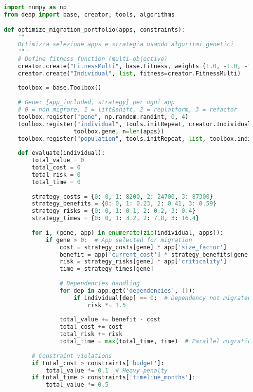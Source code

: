 \begin{lstlisting}[language=Python, caption=Algoritmo Genetico per Portfolio Optimization]
import numpy as np
from deap import base, creator, tools, algorithms

def optimize_migration_portfolio(apps, constraints):
    """
    Ottimizza selezione apps e strategia usando algoritmi genetici
    """
    # Define fitness function (multi-objective)
    creator.create("FitnessMulti", base.Fitness, weights=(1.0, -1.0, -1.0))
    creator.create("Individual", list, fitness=creator.FitnessMulti)
    
    toolbox = base.Toolbox()
    
    # Gene: [app_included, strategy] per ogni app
    # 0 = non migrare, 1 = lift&shift, 2 = replatform, 3 = refactor
    toolbox.register("gene", np.random.randint, 0, 4)
    toolbox.register("individual", tools.initRepeat, creator.Individual,
                    toolbox.gene, n=len(apps))
    toolbox.register("population", tools.initRepeat, list, toolbox.individual)
    
    def evaluate(individual):
        total_value = 0
        total_cost = 0
        total_risk = 0
        total_time = 0
        
        strategy_costs = {0: 0, 1: 8200, 2: 24700, 3: 87300}
        strategy_benefits = {0: 0, 1: 0.23, 2: 0.41, 3: 0.59}
        strategy_risks = {0: 0, 1: 0.1, 2: 0.2, 3: 0.4}
        strategy_times = {0: 0, 1: 3.2, 2: 7.8, 3: 16.4}
        
        for i, (gene, app) in enumerate(zip(individual, apps)):
            if gene > 0:  # App selected for migration
                cost = strategy_costs[gene] * app['size_factor']
                benefit = app['current_cost'] * strategy_benefits[gene] * 5
                risk = strategy_risks[gene] * app['criticality']
                time = strategy_times[gene]
                
                # Dependencies handling
                for dep in app.get('dependencies', []):
                    if individual[dep] == 0:  # Dependency not migrated
                        risk *= 1.5
                
                total_value += benefit - cost
                total_cost += cost
                total_risk += risk
                total_time = max(total_time, time)  # Parallel migrations
        
        # Constraint violations
        if total_cost > constraints['budget']:
            total_value *= 0.1  # Heavy penalty
        if total_time > constraints['timeline_months']:
            total_value *= 0.5
        

\end{lstlisting}
